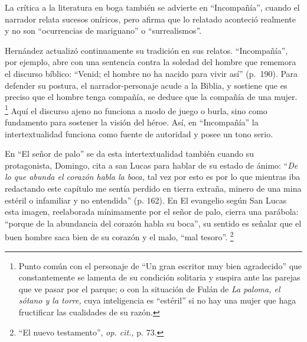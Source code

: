 \documentclass[14pt,twoside,final]{extbook} %
\let\oldfootnote\footnote
\renewcommand\footnote[1]{%
\oldfootnote{\hspace{1mm}#1}}
\begin{document}
La crítica a la literatura en boga también se advierte en ``Incompañía'', cuando el narrador relata sucesos oníricos, pero afirma que lo relatado aconteció realmente y no son ``ocurrencias de mariguano'' o ``surrealismos''.

Hernández actualizó continuamente su tradición en sus relatos. ``Incompañía'', por ejemplo, abre con una sentencia contra la soledad del hombre que rememora el discurso bíblico: ``Venid; el hombre no ha nacido para vivir así'' (p.~190). Para defender su postura, el narrador-personaje acude a la Biblia, y sostiene que es preciso que el hombre tenga compañía, se deduce que la compañía de una mujer.\footnote{Punto común con el personaje de ``Un gran escritor muy bien agradecido'' que constantemente se lamenta de su condición solitaria y suspira ante las parejas que ve pasar por el parque; o con la situación de Fulán de \emph{La paloma, el sótano y la torre,} cuya inteligencia es ``estéril'' si no hay una mujer que haga fructificar las cualidades de su razón.} Aquí el discurso ajeno no funciona a modo de juego o burla, sino como fundamento para sostener la visión del héroe. Así, en ``Incompañía'' la intertextualidad funciona como fuente de autoridad y posee un tono serio.

En ``El señor de palo'' se da esta intertextualidad también cuando su protagonista, Domingo, cita a san Lucas para hablar de su estado de ánimo: ``\emph{De lo que abunda el corazón habla la boca,} tal vez por esto es por lo que mientras iba redactando este capítulo me sentía perdido en tierra extraña, minero de una mina estéril o infamiliar y no entendida'' (p. 162). En El evangelio según San Lucas esta imagen, reelaborada mínimamente por el señor de palo, cierra una parábola: ``porque de la abundancia del corazón habla su boca'', su sentido es señalar que el buen hombre saca bien de su corazón y el malo, ``mal tesoro''.\footnote{``El nuevo testamento'', \emph{op. cit.,} p. 73.}
\end{document}
